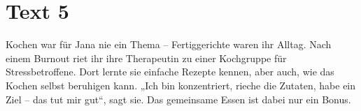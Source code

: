 \documentclass[a4paper]{article}
\begin{document}
   \section{Text 5}

      Kochen war für Jana nie ein Thema – Fertiggerichte waren ihr Alltag. Nach einem Burnout riet ihr ihre Therapeutin zu einer Kochgruppe für Stressbetroffene. Dort lernte sie einfache Rezepte kennen, aber auch, wie das Kochen selbst beruhigen kann. „Ich bin konzentriert, rieche die Zutaten, habe ein Ziel – das tut mir gut“, sagt sie. Das gemeinsame Essen ist dabei nur ein Bonus.

      
      
\end{document}

